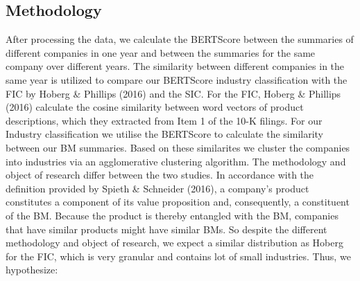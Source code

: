 \documentclass[
]{article}
\begin{document}
\begin{table}[!h]
\centering
\caption{Descriptive Statistics of Number of Words in Original Filings}
\centering
{}
\end{table}

\subsection{Methodology}\label{methodology}

After processing the data, we calculate the BERTScore between the
summaries of different companies in one year and between the summaries
for the same company over different years. The similarity between
different companies in the same year is utilized to compare our
BERTScore industry classification with the FIC by Hoberg \& Phillips
(2016) and the SIC. For the FIC, Hoberg \& Phillips (2016) calculate the
cosine similarity between word vectors of product descriptions, which
they extracted from Item 1 of the 10-K filings. For our Industry
classification we utilise the BERTScore to calculate the similarity
between our BM summaries. Based on these similarites we cluster the
companies into industries via an agglomerative clustering algorithm. The
methodology and object of research differ between the two studies. In
accordance with the definition provided by Spieth \& Schneider (2016), a
company's product constitutes a component of its value proposition and,
consequently, a constituent of the BM. Because the product is thereby
entangled with the BM, companies that have similar products might have
similar BMs. So despite the different methodology and object of
research, we expect a similar distribution as Hoberg for the FIC, which
is very granular and contains lot of small industries. Thus, we
hypothesize:
\end{document}
